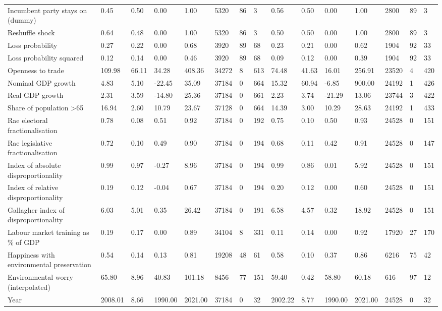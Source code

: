 \begin{longtable}{lllllllllllllll}
Incumbent party stays on (dummy) & 0.45 & 0.50 & 0.00 & 1.00 & 5320 & 86 & 3 & 0.56 & 0.50 & 0.00 & 1.00 & 2800 & 89 & 3\\
Reshuffle shock & 0.64 & 0.48 & 0.00 & 1.00 & 5320 & 86 & 3 & 0.50 & 0.50 & 0.00 & 1.00 & 2800 & 89 & 3\\
Loss probability & 0.27 & 0.22 & 0.00 & 0.68 & 3920 & 89 & 68 & 0.23 & 0.21 & 0.00 & 0.62 & 1904 & 92 & 33\\
\addlinespace
Loss probability squared & 0.12 & 0.14 & 0.00 & 0.46 & 3920 & 89 & 68 & 0.09 & 0.12 & 0.00 & 0.39 & 1904 & 92 & 33\\
Openness to trade & 109.98 & 66.11 & 34.28 & 408.36 & 34272 & 8 & 613 & 74.48 & 41.63 & 16.01 & 256.91 & 23520 & 4 & 420\\
Nominal GDP growth & 4.83 & 5.10 & -22.45 & 35.09 & 37184 & 0 & 664 & 15.32 & 60.94 & -6.85 & 900.00 & 24192 & 1 & 426\\
Real GDP growth & 2.31 & 3.59 & -14.80 & 25.36 & 37184 & 0 & 661 & 2.23 & 3.74 & -21.29 & 13.06 & 23744 & 3 & 422\\
Share of population >65 & 16.94 & 2.60 & 10.79 & 23.67 & 37128 & 0 & 664 & 14.39 & 3.00 & 10.29 & 28.63 & 24192 & 1 & 433\\
\addlinespace
Rae electoral fractionalisation & 0.78 & 0.08 & 0.51 & 0.92 & 37184 & 0 & 192 & 0.75 & 0.10 & 0.50 & 0.93 & 24528 & 0 & 151\\
Rae legislative fractionalisation & 0.72 & 0.10 & 0.49 & 0.90 & 37184 & 0 & 194 & 0.68 & 0.11 & 0.42 & 0.91 & 24528 & 0 & 147\\
Index of absolute disproportionality & 0.99 & 0.97 & -0.27 & 8.96 & 37184 & 0 & 194 & 0.99 & 0.86 & 0.01 & 5.92 & 24528 & 0 & 151\\
Index of relative disproportionality & 0.19 & 0.12 & -0.04 & 0.67 & 37184 & 0 & 194 & 0.20 & 0.12 & 0.00 & 0.60 & 24528 & 0 & 151\\
Gallagher index of disproportionality & 6.03 & 5.01 & 0.35 & 26.42 & 37184 & 0 & 191 & 6.58 & 4.57 & 0.32 & 18.92 & 24528 & 0 & 151\\
\addlinespace
Labour market training as \% of GDP & 0.19 & 0.17 & 0.00 & 0.89 & 34104 & 8 & 331 & 0.11 & 0.14 & 0.00 & 0.92 & 17920 & 27 & 170\\
Happiness with environmental preservation & 0.54 & 0.14 & 0.13 & 0.81 & 19208 & 48 & 61 & 0.58 & 0.10 & 0.37 & 0.86 & 6216 & 75 & 42\\
Environmental worry (interpolated) & 65.80 & 8.96 & 40.83 & 101.18 & 8456 & 77 & 151 & 59.40 & 0.42 & 58.80 & 60.18 & 616 & 97 & 12\\
Year & 2008.01 & 8.66 & 1990.00 & 2021.00 & 37184 & 0 & 32 & 2002.22 & 8.77 & 1990.00 & 2021.00 & 24528 & 0 & 32\\
\bottomrule
\end{longtable}

